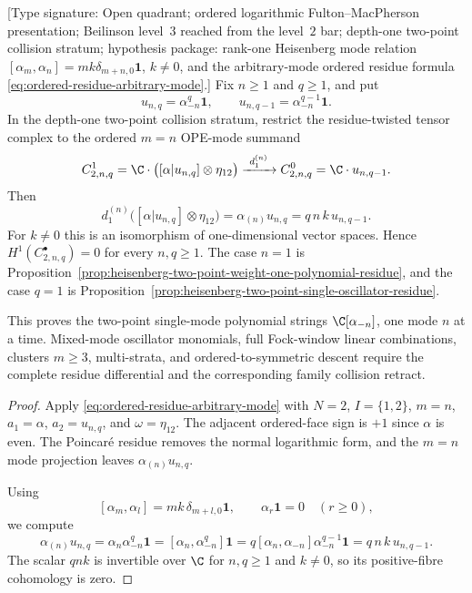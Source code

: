 \begin{proposition}
\label{prop:heisenberg-two-point-single-mode-polynomial-residue}
\textup{[Type signature: Open quadrant; ordered logarithmic
Fulton--MacPherson presentation; Beilinson level~$3$ reached from the
level~$2$ bar; depth-one two-point collision stratum; hypothesis
package: rank-one Heisenberg mode relation
\([\alpha_m,\alpha_n]=mk\delta_{m+n,0}\mathbf1\), \(k\neq0\), and the
arbitrary-mode ordered residue formula
\eqref{eq:ordered-residue-arbitrary-mode}.]}
Fix \(n\geq1\) and \(q\geq1\), and put
\[
 u_{n,q}=\alpha_{-n}^{q}\mathbf1,
 \qquad
 u_{n,q-1}=\alpha_{-n}^{q-1}\mathbf1 .
\]
In the depth-one two-point collision stratum, restrict the
residue-twisted tensor complex to the ordered \(m=n\) OPE-mode
summand
\[
 C^1_{2,n,q}
 =
 \C\cdot\bigl([\alpha|u_{n,q}]\otimes\eta_{12}\bigr)
 \xrightarrow{\ d_1^{(n)}\ }
 C^0_{2,n,q}
 =
 \C\cdot u_{n,q-1}.
\]
Then
\[
 d_1^{(n)}\bigl([\alpha|u_{n,q}]\otimes\eta_{12}\bigr)
 =
 \alpha_{(n)}u_{n,q}
 =
 q\,n\,k\,u_{n,q-1}.
\]
For \(k\neq0\) this is an isomorphism of one-dimensional vector
spaces.  Hence \(H^1(C^\bullet_{2,n,q})=0\) for every \(n,q\geq1\).
The case \(n=1\) is
Proposition~\ref{prop:heisenberg-two-point-weight-one-polynomial-residue},
and the case \(q=1\) is
Proposition~\ref{prop:heisenberg-two-point-single-oscillator-residue}.

This proves the two-point single-mode polynomial strings
\(\C[\alpha_{-n}]\), one mode \(n\) at a time.  Mixed-mode oscillator
monomials, full Fock-window linear combinations, clusters \(m\geq3\),
multi-strata, and ordered-to-symmetric descent require the complete
residue differential and the corresponding family collision retract.
\end{proposition}

\begin{proof}
Apply \eqref{eq:ordered-residue-arbitrary-mode} with \(N=2\),
\(I=\{1,2\}\), \(m=n\), \(a_1=\alpha\), \(a_2=u_{n,q}\), and
\(\omega=\eta_{12}\).  The adjacent ordered-face sign is \(+1\) since
\(\alpha\) is even.  The Poincar\'e residue removes the normal
logarithmic form, and the \(m=n\) mode projection leaves
\(\alpha_{(n)}u_{n,q}\).

Using
\[
 [\alpha_m,\alpha_l]=mk\,\delta_{m+l,0}\mathbf1,
 \qquad
 \alpha_r\mathbf1=0\quad(r\geq0),
\]
we compute
\[
 \alpha_{(n)}u_{n,q}
 =
 \alpha_n\alpha_{-n}^{q}\mathbf1
 =
 [\alpha_n,\alpha_{-n}^{q}]\mathbf1
 =
 q[\alpha_n,\alpha_{-n}]\alpha_{-n}^{q-1}\mathbf1
 =
 q\,n\,k\,u_{n,q-1}.
\]
The scalar \(qnk\) is invertible over \(\C\) for \(n,q\geq1\) and
\(k\neq0\), so its positive-fibre cohomology is zero.
\end{proof}


